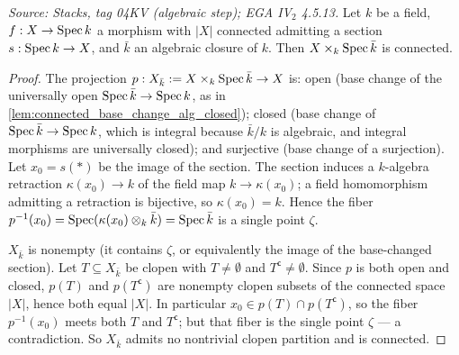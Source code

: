 \begin{lemma}\leanok
  \label{lem:connected_base_change_algebraic_closure}
  \textit{Source: Stacks, tag 04KV (algebraic step); EGA IV\(_2\) 4.5.13.}
  Let \(k\) be a field, \(f : X \to \operatorname{Spec} k\) a morphism with \(|X|\)
  connected admitting a section \(s : \operatorname{Spec} k \to X\), and
  \(\bar k\) an algebraic closure of \(k\). Then
  \(X \times_k \operatorname{Spec} \bar k\) is connected.
\end{lemma}
\begin{proof}
  \leanok
  The projection \(p : X_{\bar k} := X \times_k \operatorname{Spec} \bar k \to X\) is:
  open (base change of the universally open \(\operatorname{Spec} \bar k \to \operatorname{Spec}
  k\), as in \cref{lem:connected_base_change_alg_closed}); closed
  (base change of \(\operatorname{Spec} \bar k \to \operatorname{Spec} k\), which is integral
  because \(\bar k / k\) is algebraic, and integral morphisms are
  universally closed); and surjective (base change of a surjection).
  Let \(x_0 = s(\ast)\) be the image of the section. The section
  induces a \(k\)-algebra retraction \(\kappa(x_0) \to k\) of the field
  map \(k \to \kappa(x_0)\); a field homomorphism admitting a
  retraction is bijective, so \(\kappa(x_0) = k\). Hence the fiber
  \(p^{-1}(x_0) = \operatorname{Spec}(\kappa(x_0) \otimes_k \bar k) = \operatorname{Spec} \bar k\)
  is a single point \(\zeta\).

  \(X_{\bar k}\) is nonempty (it contains \(\zeta\), or equivalently
  the image of the base-changed section). Let \(T \subseteq
  X_{\bar k}\) be clopen with \(T \neq \emptyset\) and
  \(T^{\mathsf c} \neq \emptyset\). Since \(p\) is both open and
  closed, \(p(T)\) and \(p(T^{\mathsf c})\) are nonempty clopen subsets
  of the connected space \(|X|\), hence both equal \(|X|\). In
  particular \(x_0 \in p(T) \cap p(T^{\mathsf c})\), so the fiber
  \(p^{-1}(x_0)\) meets both \(T\) and \(T^{\mathsf c}\); but that
  fiber is the single point \(\zeta\) — a contradiction. So
  \(X_{\bar k}\) admits no nontrivial clopen partition and is
  connected.
\end{proof}

